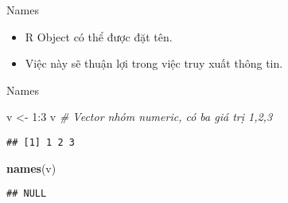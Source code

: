 \documentclass[
  ignorenonframetext,
]{beamer}
\newenvironment{Shaded}{}{}
\newcommand{\CommentTok}[1]{\textcolor[rgb]{0.38,0.63,0.69}{\textit{#1}}}
\newcommand{\DecValTok}[1]{\textcolor[rgb]{0.25,0.63,0.44}{#1}}
\newcommand{\KeywordTok}[1]{\textcolor[rgb]{0.00,0.44,0.13}{\textbf{#1}}}
\newcommand{\NormalTok}[1]{#1}
\newcommand{\OperatorTok}[1]{\textcolor[rgb]{0.40,0.40,0.40}{#1}}
\newcommand{\StringTok}[1]{\textcolor[rgb]{0.25,0.44,0.63}{#1}}
\begin{document}
\begin{frame}{Names}
\protect\hypertarget{names}{}

\begin{itemize}[<+->]
\item
  R Object có thể được đặt tên.
\item
  Việc này sẽ thuận lợi trong việc truy xuất thông tin.
\end{itemize}

\end{frame}

\begin{frame}[fragile]{Names}
\protect\hypertarget{names-1}{}

\begin{Shaded}
\begin{Highlighting}[]
\NormalTok{v <-}\StringTok{ }\DecValTok{1}\OperatorTok{:}\DecValTok{3}
\NormalTok{v }\CommentTok{# Vector nhóm numeric, có ba giá trị 1,2,3}
\end{Highlighting}
\end{Shaded}

\begin{verbatim}
## [1] 1 2 3
\end{verbatim}

\begin{Shaded}
\begin{Highlighting}[]
\KeywordTok{names}\NormalTok{(v)}
\end{Highlighting}
\end{Shaded}

\begin{verbatim}
## NULL
\end{verbatim}

\end{frame}
\end{document}
